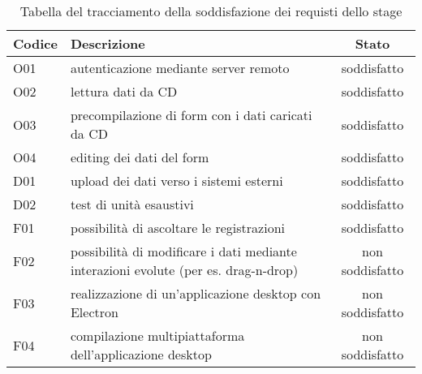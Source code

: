 \renewcommand{\arraystretch}{1.8} %
\begin{table}[H]%
  \begin{tabularx}{\textwidth}{|l|X|c|}
    \hline
    \textbf{Codice} & \textbf{Descrizione}                                                                & \textbf{Stato}  \\
    \hline
    O01             & autenticazione mediante server remoto                                               & soddisfatto     \\
    \hline
    O02             & lettura dati da CD                                                                  & soddisfatto     \\
    \hline
    O03             & precompilazione di form con i dati caricati da CD                                   & soddisfatto     \\
    \hline
    O04             & editing dei dati del form                                                           & soddisfatto     \\
    \hline
    D01             & upload dei dati verso i sistemi esterni                                             & soddisfatto     \\
    \hline
    D02             & test di unità esaustivi                                                             & soddisfatto     \\
    \hline
    F01             & possibilità di ascoltare le registrazioni                                           & soddisfatto     \\
    \hline
    F02             & possibilità di modificare i dati mediante interazioni evolute (per es. drag-n-drop) & non soddisfatto \\
    \hline
    F03             & realizzazione di un'applicazione desktop con Electron                               & non soddisfatto \\
    \hline
    F04             & compilazione multipiattaforma dell'applicazione desktop                             & non soddisfatto \\
    \hline
  \end{tabularx}
  \\
  \label{tab:soddisfazione-requisiti-stage}
  \caption{Tabella del tracciamento della soddisfazione dei requisti dello stage}
\end{table}%

